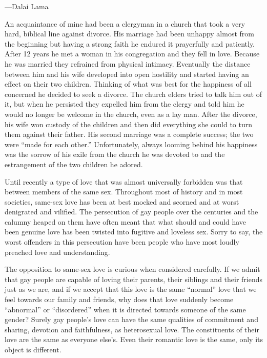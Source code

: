 \documentclass[10pt, openright]{book}
\newenvironment{epigram-2-cite}%
{%
\quoting[leftmargin=2.5cm,rightmargin=2.5cm]%
\noindent\normal\hspace*{\fill} 
}%
{\endquoting\vspace{1em}
}%
\begin{document}
\begin{epigram-2-cite}
—Dalai Lama
\end{epigram-2-cite}

An acquaintance of mine had been a clergyman in a church that took a very hard, biblical line against divorce. His marriage had been unhappy almost from the beginning but having a strong faith he endured it prayerfully and patiently. After 12 years he met a woman in his congregation and they fell in love. Because he was married they refrained from physical intimacy. Eventually the distance between him and his wife developed into open hostility and started having an effect on their two children. Thinking of what was best for the happiness of all concerned he decided to seek a divorce. The church elders tried to talk him out of it, but when he persisted they expelled him from the clergy and told him he would no longer be welcome in the church, even as a lay man. After the divorce, his wife won custody of the children and then did everything she could to turn them against their father. His second marriage was a complete success; the two were “made for each other.” Unfortunately, always looming behind his happiness was the sorrow of his exile from the church he was devoted to and the estrangement of the two children he adored.


Until recently a type of love that was almost universally forbidden was that between members of the same sex. Throughout most of history and in most societies, same-sex love has been at best mocked and scorned and at worst denigrated and vilified. The persecution of gay people over the centuries and the calumny heaped on them have often meant that what should and could have been genuine love has been twisted into fugitive and loveless sex. Sorry to say, the worst offenders in this persecution have been people who have most loudly preached love and understanding.


The opposition to same-sex love is curious when considered carefully. If we admit that gay people are capable of loving their parents, their siblings and their friends just as we are, and if we accept that this love is the same “normal” love that we feel towards our family and friends, why does that love suddenly become “abnormal” or “disordered” when it is directed towards someone of the same gender? Surely gay people’s love can have the same qualities of commitment and sharing, devotion and faithfulness, as heterosexual love. The constituents of their love are the same as everyone else’s. Even their romantic love is the same, only its object is different.
\end{document}
